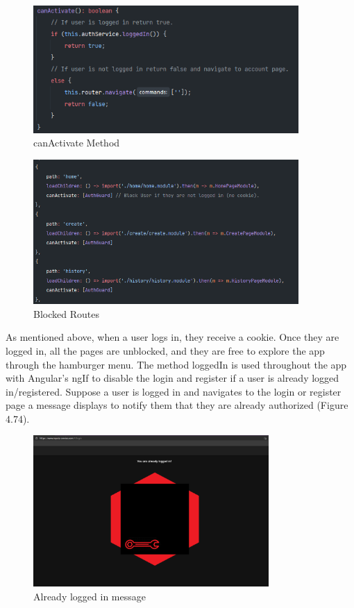\begin{figure}[H]
    \centering
    \caption{canActivate Method}
    \label{image:canActivate}
    \includegraphics[width=0.9\textwidth]{images/repota/auth_guard/can_activate.png}
\end{figure}

\begin{figure}[H]
    \centering
    \caption{Blocked Routes}
    \label{image:blocked}
    \includegraphics[width=0.9\textwidth]{images/repota/auth_guard/blocked_routes.png}
\end{figure}

As mentioned above, when a user logs in, they receive a cookie. Once they are logged in, all the pages are unblocked, and they are free to explore the app through the hamburger menu. The method loggedIn is used throughout the app with Angular's ngIf to disable the login and register if a user is already logged in/registered. Suppose a user is logged in and navigates to the login or register page a message displays to notify them that they are already authorized (Figure 4.74). 

\begin{figure}[H]
    \centering
    \caption{Already logged in message}
    \label{image:alreadyLoggedIn}
    \includegraphics[width=0.8\textwidth]{images/repota/UI/already_loggedIn.png}
\end{figure}

